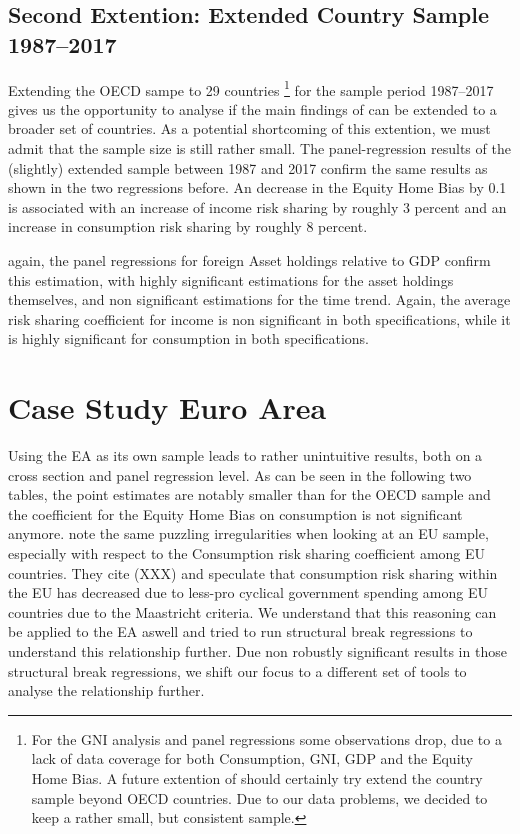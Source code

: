 \documentclass[12pt,a4paper]{article}
\begin{document}


\subsection{Second Extention: Extended Country Sample 1987--2017}
Extending the OECD sampe to 29 countries
\footnote{For the GNI analysis and panel regressions some observations drop, due to a lack of data coverage for both Consumption, GNI, GDP 
and the Equity Home Bias. A future extention of \textcite{main} should certainly try extend the country sample beyond OECD countries. Due to our data problems, we decided to keep a rather
small, but consistent sample.} for the sample period 1987--2017 gives us the opportunity to analyse if the main findings of \textcite{main} can be 
extended to a broader set of countries. As a potential shortcoming of this extention, we must admit that the sample size is still rather small. 
The panel-regression results of the (slightly) extended sample between 1987 and 2017 confirm the same results as shown in the 
two regressions before. 
An decrease in the Equity Home Bias by 0.1 is associated with an increase of income risk sharing by roughly 3 percent and
an increase in consumption risk sharing by roughly 8 percent. 


again, the panel regressions for foreign Asset holdings relative to GDP confirm this estimation, with highly significant estimations 
for the asset holdings themselves, and non significant estimations for the time trend. Again, the average risk sharing coefficient for 
income is non significant in both specifications, while it is highly significant for consumption in both specifications.




\section{Case Study Euro Area}
Using the EA as its own sample leads to rather unintuitive results, both on a cross section and panel regression level. As can be seen in the following two tables, the point 
estimates are notably smaller than for the OECD sample and the coefficient for the Equity Home Bias on consumption is not significant anymore. 
\textcite{main} note the same puzzling irregularities when looking at an EU sample, especially with respect to the Consumption risk sharing coefficient among EU countries. They cite 
(XXX) and speculate that consumption risk sharing within the EU has decreased due to less-pro cyclical government spending among EU countries due to the Maastricht criteria. We 
understand that this reasoning can be applied to the EA aswell and tried to run structural break regressions to understand this relationship further. Due non robustly significant results 
in those structural break regressions, we shift our focus to a different set of tools to analyse the relationship further. 
\end{document}
